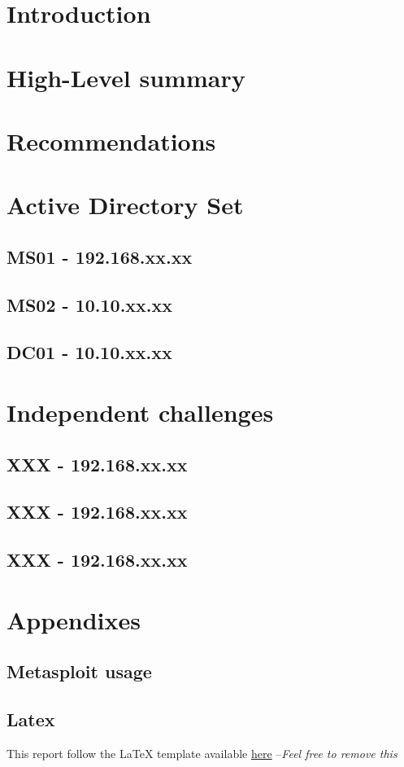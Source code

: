 \documentclass{article}
\begin{document}


\section{Introduction}

\newpage

\section{High-Level summary}

\section{Recommendations}

\newpage


\tableofcontents
\newpage

\section{Active Directory Set}

\subsection{MS01 - 192.168.xx.xx}

\newpage
\subsection{MS02 - 10.10.xx.xx}


\newpage
\subsection{DC01 - 10.10.xx.xx}


\newpage
\section{Independent challenges}
\subsection{XXX - 192.168.xx.xx}


\newpage
\subsection{XXX - 192.168.xx.xx}


\newpage
\subsection{XXX - 192.168.xx.xx}




\newpage
\section{Appendixes}
\subsection{Metasploit usage}
\subsection{Latex}
This report follow the \LaTeX\␣ template available \href{https://github.com/nicoledozo/oscp-latex-report}{here} --\textit{Feel free to remove this}
\end{document}
